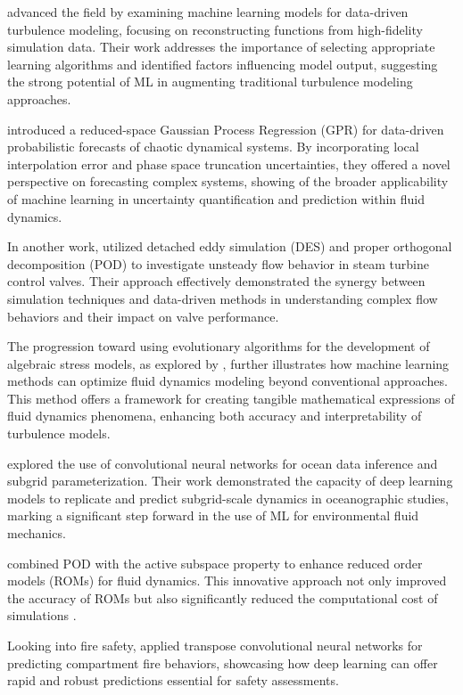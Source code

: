 \citet{Zhang2015} advanced the field by examining machine learning models for data-driven turbulence modeling, focusing on reconstructing functions from high-fidelity simulation data. Their work addresses the importance of selecting appropriate learning algorithms and identified factors influencing model output, suggesting the strong potential of ML in augmenting traditional turbulence modeling approaches.

\cite{Wan2017a} introduced a reduced-space Gaussian Process Regression (GPR) for data-driven probabilistic forecasts of chaotic dynamical systems. By incorporating local interpolation error and phase space truncation uncertainties, they offered a novel perspective on forecasting complex systems, showing of the broader applicability of machine learning in uncertainty quantification and prediction within fluid dynamics.

In another work, \citet{Wang2017a} utilized detached eddy simulation (DES) and proper orthogonal decomposition (POD) to investigate unsteady flow behavior in steam turbine control valves. Their approach effectively demonstrated the synergy between simulation techniques and data-driven methods in understanding complex flow behaviors and their impact on valve performance.

The progression toward using evolutionary algorithms for the development of algebraic stress models, as explored by \citet{Weatheritt2017c}, further illustrates how machine learning methods can optimize fluid dynamics modeling beyond conventional approaches. This method offers a framework for creating tangible mathematical expressions of fluid dynamics phenomena, enhancing both accuracy and interpretability of turbulence models.

\citet{Bolton2019b} explored the use of convolutional neural networks for ocean data inference and subgrid parameterization. Their work demonstrated the capacity of deep learning models to replicate and predict subgrid-scale dynamics in oceanographic studies, marking a significant step forward in the use of ML for environmental fluid mechanics.

\citet{Demo2019c} combined POD with the active subspace property to enhance reduced order models (ROMs) for fluid dynamics. This innovative approach not only improved the accuracy of ROMs but also significantly reduced the computational cost of simulations .

Looking into fire safety, \cite{Hodges2019c} applied transpose convolutional neural networks for predicting compartment fire behaviors, showcasing how deep learning can offer rapid and robust predictions essential for safety assessments.

